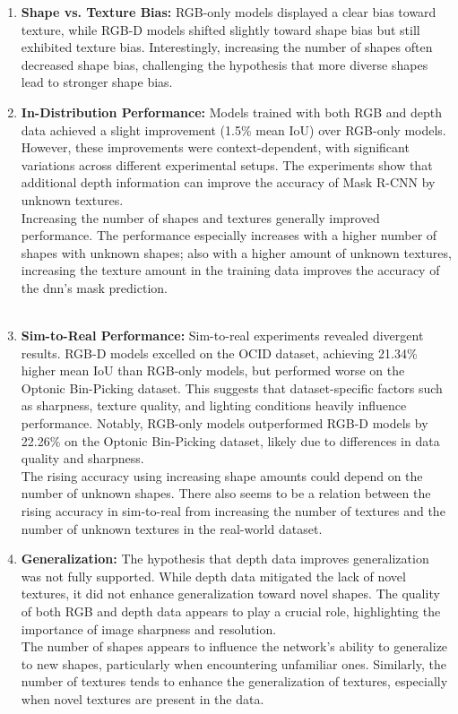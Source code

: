 		\begin{enumerate}
			\item \textbf{Shape vs. Texture Bias:} RGB-only models displayed a clear bias toward texture, while RGB-D models shifted slightly toward shape bias but still exhibited texture bias. Interestingly, increasing the number of shapes often decreased shape bias, challenging the hypothesis that more diverse shapes lead to stronger shape bias.
			
			\item \textbf{In-Distribution Performance:} Models trained with both RGB and depth data achieved a slight improvement (1.5\% mean IoU) over RGB-only models. However, these improvements were context-dependent, with significant variations across different experimental setups. The experiments show that additional depth information can improve the accuracy of Mask R-CNN by unknown textures.\\
			Increasing the number of shapes and textures generally improved performance. The performance especially increases with a higher number of shapes with unknown shapes; also with a higher amount of unknown textures, increasing the texture amount in the training data improves the accuracy of the \ac{dnn}'s mask prediction. 
			\\
			\\
			\item \textbf{Sim-to-Real Performance:} Sim-to-real experiments revealed divergent results. RGB-D models excelled on the OCID dataset, achieving 21.34\% higher mean IoU than RGB-only models, but performed worse on the Optonic Bin-Picking dataset. This suggests that dataset-specific factors such as sharpness, texture quality, and lighting conditions heavily influence performance. Notably, RGB-only models outperformed RGB-D models by 22.26\% on the Optonic Bin-Picking dataset, likely due to differences in data quality and sharpness.\\
			The rising accuracy using increasing shape amounts could depend on the number of unknown shapes. There also seems to be a relation between the rising accuracy in sim-to-real from increasing the number of textures and the number of unknown textures in the real-world dataset.
			
			\item \textbf{Generalization:} The hypothesis that depth data improves generalization was not fully supported. While depth data mitigated the lack of novel textures, it did not enhance generalization toward novel shapes. The quality of both RGB and depth data appears to play a crucial role, highlighting the importance of image sharpness and resolution.\\
			The number of shapes appears to influence the network's ability to generalize to new shapes, particularly when encountering unfamiliar ones. Similarly, the number of textures tends to enhance the generalization of textures, especially when novel textures are present in the data.
		\end{enumerate}
		
